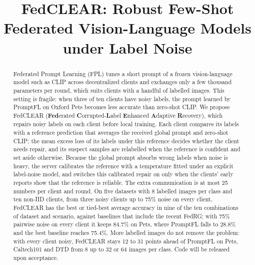 \documentclass[runningheads]{llncs}
\begin{document}
%
\title{FedCLEAR: Robust Few-Shot Federated Vision-Language Models under Label Noise}

\maketitle

\begin{abstract}
Federated Prompt Learning (FPL) tunes a short prompt of a frozen vision-language model such as CLIP
across decentralized clients and exchanges only a few thousand parameters per round, which suits
clients with a handful of labelled images. This setting is fragile: when three of ten clients have
noisy labels, the prompt learned by PromptFL on Oxford Pets becomes less accurate than zero-shot CLIP. We propose FedCLEAR (\textbf{Fed}erated \textbf{C}orrupted-\textbf{L}abel
\textbf{E}nhanced \textbf{A}daptive \textbf{R}ecovery), which repairs noisy labels on each client
before local training. Each client compares its labels with a reference prediction that averages the
received global prompt and zero-shot CLIP; the mean excess loss of its labels under this reference decides whether the client needs repair, and its suspect samples are relabelled when the reference is confident and set aside
otherwise. Because the global prompt absorbs wrong labels when noise is heavy, the server calibrates
the reference with a temperature fitted under an explicit label-noise model, and switches this
calibrated repair on only when the clients' early reports show that the reference is reliable.
The extra communication is at most 25 numbers per client and round. On five
datasets with 8 labelled images per class and ten non-IID clients, from three noisy clients up to
75\% noise on every client, FedCLEAR has the best or tied-best average accuracy in nine of the ten
combinations of dataset and scenario, against baselines that include the recent FedRG; with 75\%
pairwise noise on every client it keeps 84.7\% on Pets, where PromptFL falls to 28.8\% and the best
baseline reaches 75.4\%. More labelled images do not remove the problem: with every client noisy,
FedCLEAR stays 12 to 31 points ahead of PromptFL on Pets, Caltech101 and DTD from 8 up to 32 or 64
images per class. Code will be released upon acceptance.

\end{abstract}
\end{document}
